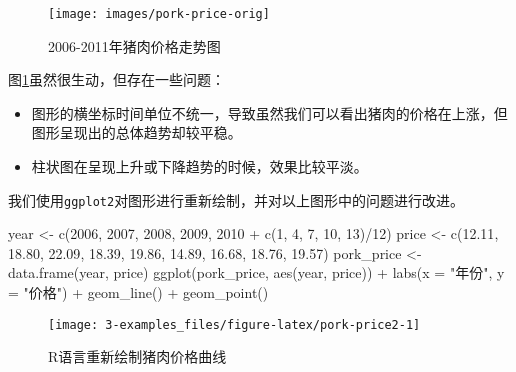 \documentclass[
  lang=cn,
  11pt,
  scheme=chinese,
  chinesefont=nofont,
  citestyle=gb7714-2015,
  bibstyle=gb7714-2015]{elegantbook}
\newenvironment{Shaded}{\begin{snugshade}}{\end{snugshade}}
\newcommand{\AttributeTok}[1]{\textcolor[rgb]{0.77,0.63,0.00}{#1}}
\newcommand{\DecValTok}[1]{\textcolor[rgb]{0.00,0.00,0.81}{#1}}
\newcommand{\FloatTok}[1]{\textcolor[rgb]{0.00,0.00,0.81}{#1}}
\newcommand{\FunctionTok}[1]{\textcolor[rgb]{0.00,0.00,0.00}{#1}}
\newcommand{\NormalTok}[1]{#1}
\newcommand{\OtherTok}[1]{\textcolor[rgb]{0.56,0.35,0.01}{#1}}
\newcommand{\SpecialCharTok}[1]{\textcolor[rgb]{0.00,0.00,0.00}{#1}}
\newcommand{\StringTok}[1]{\textcolor[rgb]{0.31,0.60,0.02}{#1}}
\providecommand{\tightlist}{%
  \setlength{\itemsep}{0pt}\setlength{\parskip}{0pt}}
\begin{document}
\begin{figure}

{\centering \texttt{[image: images/pork-price-orig]} 

}

\caption{2006-2011年猪肉价格走势图}\label{fig:pork-price1}
\end{figure}

图\ref{fig:pork-price1}虽然很生动，但存在一些问题：

\begin{itemize}
\tightlist
\item
  图形的横坐标时间单位不统一，导致虽然我们可以看出猪肉的价格在上涨，但图形呈现出的总体趋势却较平稳。
\item
  柱状图在呈现上升或下降趋势的时候，效果比较平淡。
\end{itemize}

我们使用\texttt{ggplot2}对图形进行重新绘制，并对以上图形中的问题进行改进。

\begin{Shaded}
\begin{Highlighting}[]
\NormalTok{year }\OtherTok{\textless{}{-}} \FunctionTok{c}\NormalTok{(}\DecValTok{2006}\NormalTok{, }\DecValTok{2007}\NormalTok{, }\DecValTok{2008}\NormalTok{, }\DecValTok{2009}\NormalTok{, }\DecValTok{2010} \SpecialCharTok{+} \FunctionTok{c}\NormalTok{(}\DecValTok{1}\NormalTok{, }\DecValTok{4}\NormalTok{, }\DecValTok{7}\NormalTok{, }\DecValTok{10}\NormalTok{, }\DecValTok{13}\NormalTok{)}\SpecialCharTok{/}\DecValTok{12}\NormalTok{)}
\NormalTok{price }\OtherTok{\textless{}{-}} \FunctionTok{c}\NormalTok{(}\FloatTok{12.11}\NormalTok{, }\FloatTok{18.80}\NormalTok{, }\FloatTok{22.09}\NormalTok{, }\FloatTok{18.39}\NormalTok{, }\FloatTok{19.86}\NormalTok{, }\FloatTok{14.89}\NormalTok{, }\FloatTok{16.68}\NormalTok{, }\FloatTok{18.76}\NormalTok{, }\FloatTok{19.57}\NormalTok{)}
\NormalTok{pork\_price }\OtherTok{\textless{}{-}} \FunctionTok{data.frame}\NormalTok{(year, price)}
\FunctionTok{ggplot}\NormalTok{(pork\_price, }\FunctionTok{aes}\NormalTok{(year, price)) }\SpecialCharTok{+}
  \FunctionTok{labs}\NormalTok{(}\AttributeTok{x =} \StringTok{"年份"}\NormalTok{, }\AttributeTok{y =} \StringTok{"价格"}\NormalTok{) }\SpecialCharTok{+}
  \FunctionTok{geom\_line}\NormalTok{() }\SpecialCharTok{+}
  \FunctionTok{geom\_point}\NormalTok{()}
\end{Highlighting}
\end{Shaded}

\begin{figure}

{\centering \texttt{[image: 3-examples\_files/figure-latex/pork-price2-1]} 

}

\caption{R语言重新绘制猪肉价格曲线}\label{fig:pork-price2}
\end{figure}
\end{document}
